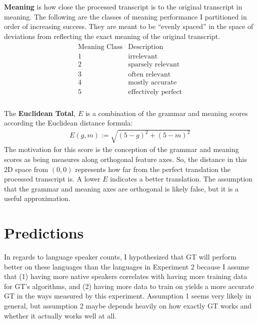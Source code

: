 \documentclass{article}
\begin{document}
\textbf{Meaning} is how close the processed transcript is to the original transcript in meaning.
The following are the classes of meaning performance I partitioned in order of increasing success.
They are meant to be ``evenly spaced'' in the space of deviations from reflecting the exact meaning of the original transcript.
\begin{align*} \begin{array}{r|l}
\text{Meaning Class} & \text{Description} \\ \hline
1 & \text{irrelevant} \\
2 & \text{sparsely relevant} \\
3 & \text{often relevant} \\
4 & \text{mostly accurate} \\
5 & \text{effectively perfect} \\
\end{array} \end{align*}





The \textbf{Euclidean Total}, $E$ is a combination of the grammar and meaning scores according the Euclidean distance formula:
\begin{align*}  E(g,m) := \sqrt{(5-g)^2 + (5-m)^2}  \end{align*} \vspace*{0.1cm}
The motivation for this score is the conception of the grammar and meaning scores as being measures along orthogonal feature axes.
So, the distance in this 2D space from $(0,0)$ represents how far from the perfect translation the processed transcript is.
A lower $E$ indicates a better translation.
The assumption that the grammar and meaning axes are orthogonal is likely false, but it is a useful approximation.


\section{Predictions}


In regards to language speaker counts, I hypothesized that GT will perform better on these languages than the languages in Experiment 2 because I assume that (1) having more native speakers correlates with having more training data for GT's algorithms, and (2) having more data to train on yields a more accurate GT in the ways measured by this experiment. Assumption 1 seems very likely in general, but assumption 2 maybe depends heavily on how exactly GT works and whether it actually works well at all.
\end{document}

